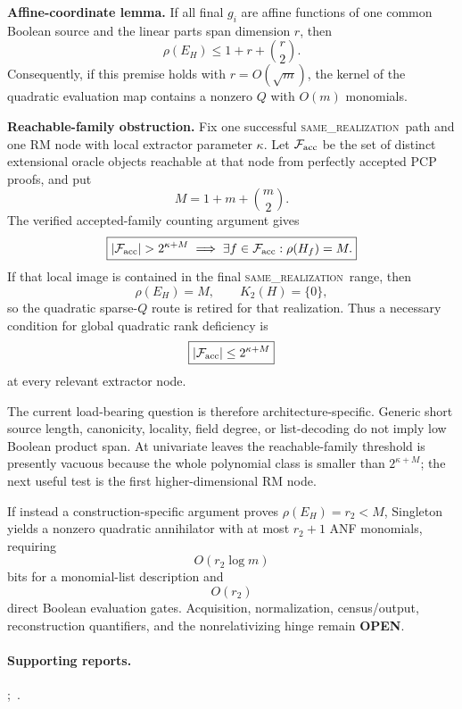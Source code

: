 \documentclass[11pt]{article}
\newcommand{\statusopen}{\textcolor{openstatus}{\textbf{OPEN}}}
\newcommand{\same}{\textsc{same\_realization}}
\begin{document}
\begin{provedbox}
\textbf{Affine-coordinate lemma.}
If all final \(g_i\) are affine functions of one common Boolean source and the linear parts span
dimension \(r\), then
\[
\boxed{
\rho(E_H)\le 1+r+\binom r2.
}
\]
Consequently, if this premise holds with \(r=O(\sqrt m)\), the kernel of the quadratic evaluation map
contains a nonzero \(Q\) with \(O(m)\) monomials.
\end{provedbox}

\begin{warningbox}
\textbf{Reachable-family obstruction.}
Fix one successful \same\ path and one RM node with local extractor parameter \(\kappa\). Let
\(\mathcal F_{\rm acc}\) be the set of distinct extensional oracle objects reachable at that node
from perfectly accepted PCP proofs, and put
\[
M=1+m+\binom m2.
\]
The verified accepted-family counting argument gives
\[
\boxed{
|\mathcal F_{\rm acc}|>2^{\kappa+M}
\;\Longrightarrow\;
\exists f\in\mathcal F_{\rm acc}:\rho(H_f)=M.
}
\]
If that local image is contained in the final \same\ range, then
\[
\rho(E_H)=M,\qquad K_2(H)=\{0\},
\]
so the quadratic sparse-\(Q\) route is retired for that realization.
Thus a necessary condition for global quadratic rank deficiency is
\[
\boxed{
|\mathcal F_{\rm acc}|\le 2^{\kappa+M}
}
\]
at every relevant extractor node.
\end{warningbox}

The current load-bearing question is therefore architecture-specific. Generic short source length,
canonicity, locality, field degree, or list-decoding do not imply low Boolean product span. At
univariate leaves the reachable-family threshold is presently vacuous because the whole polynomial
class is smaller than \(2^{\kappa+M}\); the next useful test is the first higher-dimensional RM node.

If instead a construction-specific argument proves \(\rho(E_H)=r_2<M\), Singleton yields a nonzero
quadratic annihilator with at most \(r_2+1\) ANF monomials, requiring
\[
O(r_2\log m)
\]
bits for a monomial-list description and
\[
O(r_2)
\]
direct Boolean evaluation gates. Acquisition, normalization, census/output, reconstruction
quantifiers, and the nonrelativizing hinge remain \statusopen.

\paragraph{Supporting reports.}
;\
.
\end{document}
